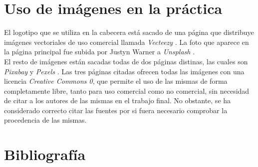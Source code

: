 \documentclass[11pt]{article}
\theoremstyle{plain}
\theoremstyle{definition}
\begin{document}
\section{Uso de imágenes en la práctica}

El logotipo que se utiliza en la cabecera está sacado de una página
que distribuye imágenes vectoriales de uso comercial llamada
\textit{Vecteezy} \cite{vecteezy}. La foto que aparece en la página
principal fue subida por Justyn Warner a \textit{Unsplash} \cite{unsplash}.\\

El resto de imágenes están sacadas todas de dos páginas distinas, las
cuales son \textit{Pixabay} \cite{pixabay} y \textit{Pexels}
\cite{pexels}. Las tres páginas citadas ofrecen todas las imágenes con
una licencia \textit{Creative Commons 0}, que permite el uso de las
mismas de forma completamente libre, tanto para uso comercial como no
comercial, sin necesidad de citar a los autores de las mismas en el
trabajo final. No obstante, se ha considerado correcto citar las
fuentes por si fuera necesario comprobar la procedencia de las mismas.

\section{Bibliografía}

\printbibliography
\end{document}
